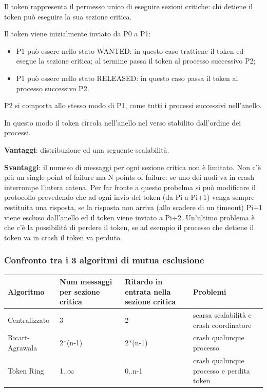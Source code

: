 \documentclass{article}
\begin{document}
Il token rappresenta il permesso unico di eseguire sezioni critiche: chi detiene il token può eseguire la sua sezione critica.

Il token viene inizialmente inviato da P0 a P1:
\begin{itemize}
    \item P1 può essere nello stato WANTED: in questo caso trattiene il token ed esegue la sezione critica; al termine passa il token al processo successivo P2;
    \item P1 può essere nello stato RELEASED: in questo caso passa il token al processo successivo P2.
\end{itemize}

P2 si comporta allo stesso modo di P1, come tutti i processi successivi nell'anello.

In questo modo il token circola nell'anello nel verso stabilito dall'ordine dei processi.

\vspace{3mm}
\textbf{Vantaggi}: distribuzione ed una seguente scalabilità.

\textbf{Svantaggi}: il numeso di messaggi per ogni sezione critica non è limitato. Non c'è più un single point of failure ma N points of failure: se uno dei nodi va in crash
interrompe l'intera catena. Per far fronte a questo probelma si può modificare il protocollo prevedendo che ad ogni invio del token (da Pi a Pi+1) venga sempre restituita
una risposta, se la risposta non arriva (allo scadere di un timeout) Pi+1 viene escluso dall'anello ed il token viene inviato a Pi+2. Un'ultimo problema è che c'è la possibilità
di perdere il token, se ad esempio il processo che detiene il token va in crash il token va perduto.

\subsubsection{Confronto tra i 3 algoritmi di mutua esclusione}
\begin{center}
    \begin{tabular}{|p{3cm}|p{3cm}|p{3cm}|p{3cm}|}
        \hline
        \textbf{Algoritmo} & \textbf{Num messaggi per sezione critica} & \textbf{Ritardo in entrata nella sezione critica} & \textbf{Problemi} \\
        \hline
        \hline
        Centralizzato & 3 & 2 & scarsa scalabilità e crash coordinatore \\
        \hline
        Ricart-Agrawala & 2*(n-1) & 2*(n-1) & crash qualunque processo \\
        \hline
        Token Ring & 1..$\infty$ & 0..n-1 & crash qualunque processo e perdita token \\
        \hline
    \end{tabular}
\end{center}
\end{document}
